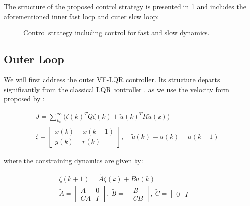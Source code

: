 The structure of the proposed control strategy is presented in \cref{fig:tikzControlStrat} and includes the aforementioned inner fast loop and outer slow loop:  

\begin{figure}[h!]
	\centering
	\resizebox{\columnwidth}{!}{
	}
	\caption{Control strategy including control for fast and slow dynamics.}
	\label{fig:tikzControlStrat}
\end{figure}

\subsection{Outer Loop}\label{subsec:OuterLoop}

We will first address the outer VF-LQR controller. Its structure departs significantly from the classical LQR controller \cite{Skogestad2005}, as we use the velocity form proposed by \cite{Pannocchia2001}:

\begin{equation}\label{eq:LagrangeProblemDeviation}
	\begin{gathered}
	J = \sum_{k_0}^{\infty} \big(\zeta(k)^TQ\zeta(k) + \tilde{u}(k)^TR\tilde{u}(k)\big) \\
	\zeta = \begin{bmatrix}	x(k)-x(k-1) \\ y(k)-r(k) \end{bmatrix}, \quad \tilde{u}(k) = u(k)-u(k-1) 
	\end{gathered}
\end{equation} 

where the constraining dynamics are given by:

\begin{equation}\label{eq:VelocityMatrices}
	\begin{gathered}
		\zeta(k+1) = \tilde{A}\zeta(k) + \tilde{B}\tilde{u}(k) \\
		\tilde{A} = \begin{bmatrix} A & 0 \\ CA & I	\end{bmatrix}, \ 
		\tilde{B} = \begin{bmatrix} B \\ CB	\end{bmatrix}, \ \tilde{C} = \begin{bmatrix} 0 & I	\end{bmatrix}
	\end{gathered}
\end{equation}

